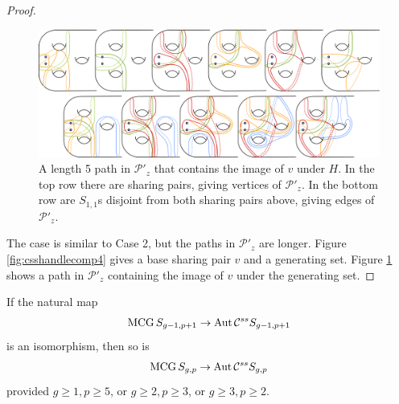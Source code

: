 \begin{proof}
  \begin{figure}[h!]
    \centering
    \includegraphics[width=\textwidth]{figures/handlecompliment4b.pdf}
    \caption{A length 5 path in $\mathcal P'_z$
    that contains the image of $v$ under $H$.
    In the top row there are sharing pairs, giving vertices of $\mathcal P'_z$.
    In the bottom row are $S_{1,1}$s disjoint from both sharing pairs above,
    giving edges of $\mathcal P'_z$.
    }
    \label{fig:csshandlecomp4b}
  \end{figure}

  The case is similar to Case 2, but the paths in $\mathcal P'_z$ are longer.
  Figure \ref{fig:csshandlecomp4} gives a base sharing pair $v$ and a generating set.
  Figure \ref{fig:csshandlecomp4b} shows a path in $\mathcal P'_z$ containing the image
  of $v$ under the generating set.
\end{proof}


\begin{lemma}
  If the natural map
  $$
    \operatorname{MCG} S_{g-1,p+1} \to \operatorname{Aut}  \mathcal C^{{ss}}  S_{g-1,p+1}
  $$
  is an isomorphism, then so is
  $$
    \operatorname{MCG} S_{g,p} \to \operatorname{Aut}  \mathcal C^{{ss}}  S_{g,p}
  $$
  provided
  $g\geq 1, p\geq 5$, or $g\geq2, p\geq 3$, or $g\geq3, p\geq 2$.
  \label{lemma:s23tos14}
\end{lemma}

